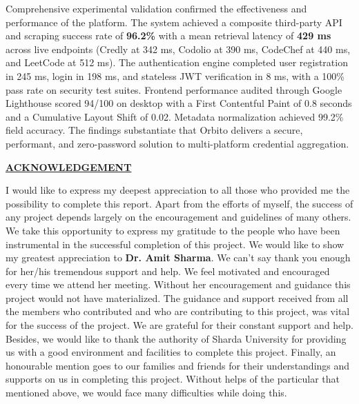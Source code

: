\documentclass[12pt,a4paper]{article}
\begin{document}
\vspace{0.4cm}
\noindent
Comprehensive experimental validation confirmed the effectiveness and performance of the platform. The system achieved a composite third-party API and scraping success rate of \textbf{96.2\%} with a mean retrieval latency of \textbf{429 ms} across live endpoints (Credly at 342 ms, Codolio at 390 ms, CodeChef at 440 ms, and LeetCode at 512 ms). The authentication engine completed user registration in 245 ms, login in 198 ms, and stateless JWT verification in 8 ms, with a 100\% pass rate on security test suites. Frontend performance audited through Google Lighthouse scored 94/100 on desktop with a First Contentful Paint of 0.8 seconds and a Cumulative Layout Shift of 0.02. Metadata normalization achieved 99.2\% field accuracy. The findings substantiate that Orbito delivers a secure, performant, and zero-password solution to multi-platform credential aggregation.

\newpage

\vspace*{0pt}
\begin{center}
    {\Large\bfseries\underline{ACKNOWLEDGEMENT}\par}
\end{center}
\vspace{0.6cm}

\noindent
I would like to express my deepest appreciation to all those who provided me the possibility to complete this report. Apart from the efforts of myself, the success of any project depends largely on the encouragement and guidelines of many others. We take this opportunity to express my gratitude to the people who have been instrumental in the successful completion of this project. We would like to show my greatest appreciation to \textbf{Dr. Amit Sharma}. We can't say thank you enough for her/his tremendous support and help. We feel motivated and encouraged every time we attend her meeting. Without her encouragement and guidance this project would not have materialized. The guidance and support received from all the members who contributed and who are contributing to this project, was vital for the success of the project. We are grateful for their constant support and help. Besides, we would like to thank the authority of Sharda University for providing us with a good environment and facilities to complete this project. Finally, an honourable mention goes to our families and friends for their understandings and supports on us in completing this project. Without helps of the particular that mentioned above, we would face many difficulties while doing this.
\end{document}

